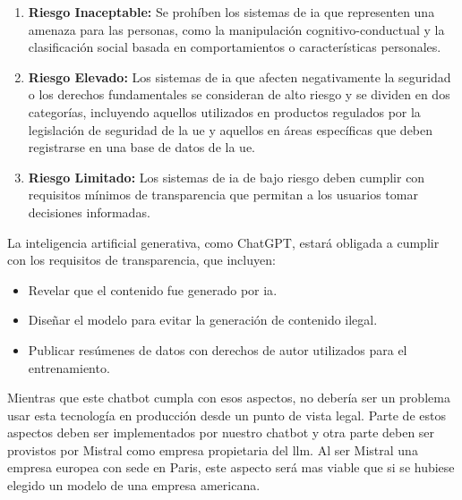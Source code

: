 \begin{enumerate}

 \item \textbf{Riesgo Inaceptable:} Se prohíben los sistemas de \acrshort{ia} que representen una amenaza para las personas, como la manipulación cognitivo-conductual y la clasificación social basada en comportamientos o características personales.

 \item \textbf{Riesgo Elevado:} Los sistemas de \acrshort{ia} que afecten negativamente la seguridad o los derechos fundamentales se consideran de alto riesgo y se dividen en dos categorías, incluyendo aquellos utilizados en productos regulados por la legislación de seguridad de la \acrshort{ue} y aquellos en áreas específicas que deben registrarse en una base de datos de la \acrshort{ue}.

 \item \textbf{Riesgo Limitado:} Los sistemas de \acrshort{ia} de bajo riesgo deben cumplir con requisitos mínimos de transparencia que permitan a los usuarios tomar decisiones informadas.

\end{enumerate}

La inteligencia artificial generativa, como ChatGPT, estará obligada a cumplir con los requisitos de transparencia, que incluyen:
\begin{itemize}
\item Revelar que el contenido fue generado por \acrlong{ia}.
\item Diseñar el modelo para evitar la generación de contenido ilegal.
\item Publicar resúmenes de datos con derechos de autor utilizados para el entrenamiento.
\end{itemize}

Mientras que este chatbot cumpla con esos aspectos, no debería ser un problema usar esta tecnología en producción desde un punto de vista legal. Parte de estos aspectos deben ser implementados por nuestro chatbot y otra parte deben ser provistos por Mistral como empresa propietaria del \acrshort{llm}. Al ser Mistral una empresa europea con sede en Paris, este aspecto será mas viable que si se hubiese elegido un modelo de una empresa americana.
